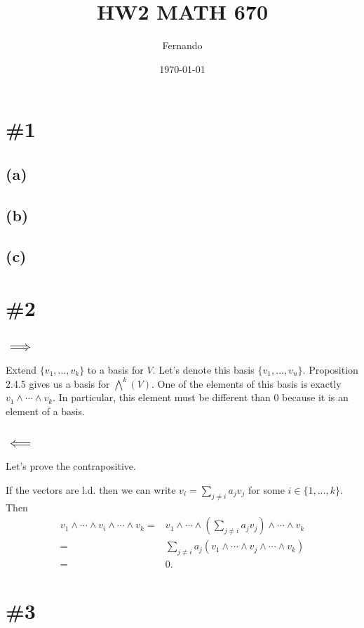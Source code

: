 \documentclass{article}
\begin{document}
\newcommand{\R}{\mathbb{R}}

\title{HW2 MATH 670}
\author{Fernando}
\date{\today}
\maketitle

\section*{\#1}
\subsection*{(a)}
\subsection*{(b)}
\subsection*{(c)}
\section*{\#2}
\subsection*{$\implies$}

Extend $\{v_1,\dots,v_k\}$ to a basis for $V$. Let's denote this basis
$\{v_1,\dots,v_n\}$. Proposition 2.4.5 gives us a basis for $\bigwedge^k(V)$.
One of the elements of this basis is exactly $v_1\wedge \cdots\wedge v_k$. In
particular, this element must be different than 0 because it is an element of a
basis.

\subsection*{$\impliedby$}
Let's prove the contrapositive.

If the vectors are l.d. then we can write $v_i=\sum_{j\neq i}a_jv_j$ for some
$i\in\{1,\dots,k\}$. Then
\begin{align*}
	v_1\wedge\cdots\wedge v_i \wedge\cdots\wedge v_k =&
	v_1\wedge\cdots\wedge \left(\sum_{j\neq i}a_jv_j\right) \wedge\cdots\wedge v_k\\
	=& \sum_{j\neq i}a_j \left(v_1\wedge\cdots\wedge v_j \wedge\cdots\wedge v_k\right)\\
	=& 0.
\end{align*}
\section*{\#3}
\end{document}
